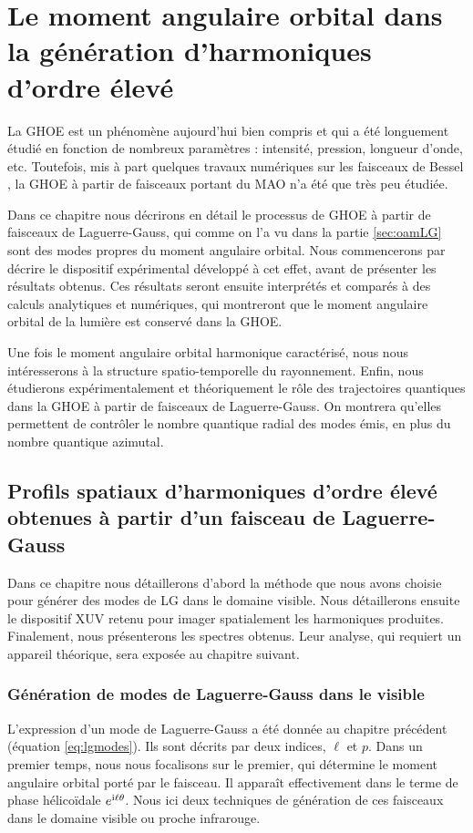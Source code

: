 \part{Le moment angulaire orbital dans la génération d'harmoniques d'ordre élevé}
\label{CH:OAM_HHG}
La GHOE est un phénomène aujourd'hui bien compris et qui a été longuement étudié en fonction de nombreux paramètres : intensité, pression, longueur d'onde, etc. Toutefois, mis à part quelques travaux numériques sur les faisceaux de Bessel , la GHOE à partir de faisceaux portant du MAO n'a été que très peu étudiée. 

Dans ce chapitre nous décrirons en détail le processus de GHOE à partir de faisceaux de Laguerre-Gauss, qui comme on l'a vu dans la partie \ref{sec:oamLG} sont des modes propres du moment angulaire orbital. Nous commencerons par décrire le dispositif expérimental développé à cet effet, avant de présenter les résultats obtenus. Ces résultats seront ensuite interprétés et comparés à des calculs analytiques et numériques, qui montreront que le moment angulaire orbital de la lumière est conservé dans la GHOE.

Une fois le moment angulaire orbital harmonique caractérisé, nous nous intéresserons à la structure spatio-temporelle du rayonnement. Enfin, nous étudierons expérimentalement et théoriquement le rôle des trajectoires quantiques dans la GHOE à partir de faisceaux de Laguerre-Gauss. On montrera qu'elles permettent de contrôler le nombre quantique radial des modes émis, en plus du nombre quantique azimutal. 
\newpage

\chapter{Profils spatiaux d'harmoniques d'ordre élevé obtenues à partir d'un faisceau de Laguerre-Gauss}
Dans ce chapitre nous détaillerons d'abord la méthode que nous avons choisie pour générer des modes de LG dans le domaine visible. Nous détaillerons ensuite le dispositif XUV retenu pour imager spatialement les harmoniques produites. Finalement, nous présenterons les spectres obtenus. Leur analyse, qui requiert un appareil théorique, sera exposée au chapitre suivant.

\section{Génération de modes de Laguerre-Gauss dans le visible}
L'expression d'un mode de Laguerre-Gauss a été donnée au chapitre précédent (équation \ref{eq:lgmodes}). Ils sont décrits par deux indices, $\ell$ et $p$. Dans un premier temps, nous nous focalisons sur le premier, qui détermine le moment angulaire orbital porté par le faisceau. Il apparaît effectivement dans le terme de phase hélicoïdale $e^{\mathrm{i}\ell\theta}$. Nous ici deux techniques de génération de ces faisceaux dans le domaine visible ou proche infrarouge.

